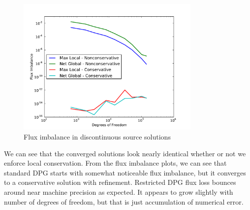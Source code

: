 \documentclass[Proposal.tex]{subfiles}
\begin{document}
\begin{figure}[p]
\centering
\includegraphics[width=0.8\textwidth]{figs/Discontinuous/modifiedFlux.pdf}
\caption{Flux imbalance in discontinuous source solutions}
\label{fig:discontinuous_flux}
\end{figure}

We can see that the converged solutions look nearly identical whether or not we enforce local conservation.
From the flux imbalance plots, we can see that standard DPG starts with somewhat noticeable flux imbalance, but it converges to a conservative solution with refinement.
Restricted DPG flux loss bounces around near machine precision as expected. It appears to grow slightly with number of degrees of freedom, but that is just accumulation of numerical error.

%  
\end{document}
